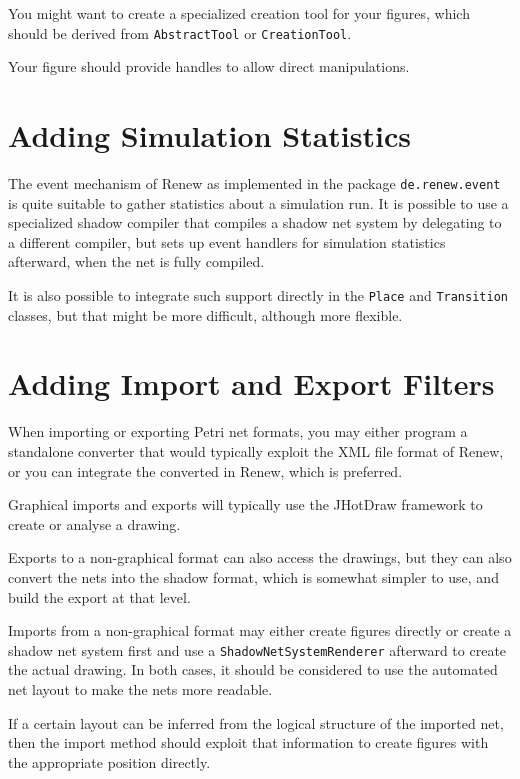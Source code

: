 You might want to create a specialized creation tool for
your figures, which should be derived from \texttt{AbstractTool}
or \texttt{CreationTool}.

Your figure should provide handles to allow direct manipulations.


\section{Adding Simulation Statistics}

The event mechanism of Renew as implemented in the package
\texttt{de.renew.event} is quite suitable to gather
statistics about a simulation run. It is possible
to use a specialized shadow compiler that compiles a shadow net system
by delegating to a different compiler, but sets up event handlers
for simulation statistics afterward, when the net is fully 
compiled. 

It is also possible to integrate such support directly in the
\texttt{Place} and \texttt{Transition} classes, but that might 
be more difficult, although more flexible.


\section{Adding Import and Export Filters}

When importing or exporting Petri net formats, you may either
program a standalone converter that would typically exploit
the XML file format of Renew, or you can integrate the
converted in Renew, which is preferred.

Graphical imports and exports will typically use the
JHotDraw framework to create or analyse a drawing.

Exports to a 
non-graphical format can also access the drawings, 
but they can also convert the nets into the shadow format,
which is somewhat simpler to use, and build the export
at that level. 

Imports from a non-graphical format may
either create figures directly or create a shadow net
system first and use a \texttt{ShadowNetSystemRenderer}
afterward to create the actual drawing. In both cases,
it should be considered to use the automated net layout to
make the nets more readable.

If a certain layout can be inferred from the logical structure
of the imported net, then the import method should exploit
that information to create figures with the appropriate
position directly.


